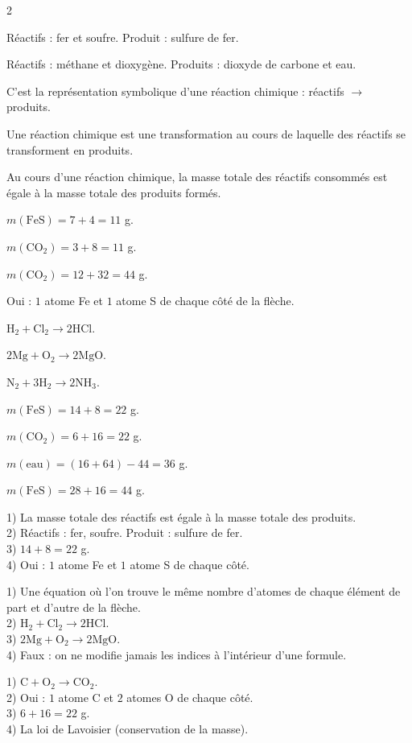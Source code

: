 \begin{multicols}{2}

Réactifs : fer et soufre. Produit : sulfure de fer.

Réactifs : méthane et dioxygène. Produits : dioxyde de carbone et eau.

C'est la représentation symbolique d'une réaction chimique : réactifs $\to$ produits.

Une réaction chimique est une transformation au cours de laquelle des réactifs se
transforment en produits.

Au cours d'une réaction chimique, la masse totale des réactifs consommés est égale à la
masse totale des produits formés.

$m(\mathrm{FeS})=7+4=11$ g.

$m(\mathrm{CO_2})=3+8=11$ g.

$m(\mathrm{CO_2})=12+32=44$ g.

Oui : $1$ atome Fe et $1$ atome S de chaque côté de la flèche.

$\mathrm{H_2}+\mathrm{Cl_2}\to2\mathrm{HCl}$.

$2\mathrm{Mg}+\mathrm{O_2}\to2\mathrm{MgO}$.

$\mathrm{N_2}+3\mathrm{H_2}\to2\mathrm{NH_3}$.

$m(\mathrm{FeS})=14+8=22$ g.

$m(\mathrm{CO_2})=6+16=22$ g.

$m(\text{eau})=(16+64)-44=36$ g.

$m(\mathrm{FeS})=28+16=44$ g.

1) La masse totale des réactifs est égale à la masse totale des produits.\\
2) Réactifs : fer, soufre. Produit : sulfure de fer.\\
3) $14+8=22$ g.\\
4) Oui : $1$ atome Fe et $1$ atome S de chaque côté.

1) Une équation où l'on trouve le même nombre d'atomes de chaque élément de part et
d'autre de la flèche.\\
2) $\mathrm{H_2}+\mathrm{Cl_2}\to2\mathrm{HCl}$.\\
3) $2\mathrm{Mg}+\mathrm{O_2}\to2\mathrm{MgO}$.\\
4) Faux : on ne modifie jamais les indices à l'intérieur d'une formule.

1) $\mathrm{C}+\mathrm{O_2}\to\mathrm{CO_2}$.\\
2) Oui : $1$ atome C et $2$ atomes O de chaque côté.\\
3) $6+16=22$ g.\\
4) La loi de Lavoisier (conservation de la masse).

\end{multicols}
\exercicesBanner

